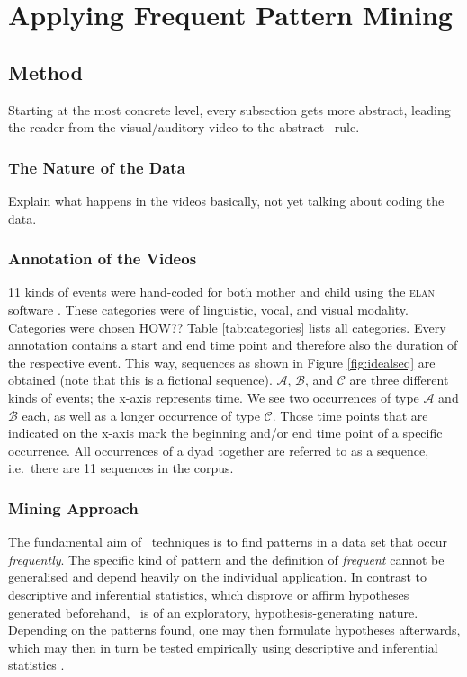 
\chapter{Applying Frequent Pattern Mining}
\section{Method}
Starting at the most concrete level, every subsection gets more abstract, leading the reader from the visual/auditory video to the abstract \fpm~rule.

\subsection{The Nature of the Data}
Explain what happens in the videos basically, not yet talking about coding the data.

\subsection{Annotation of the Videos}
11 kinds of events were hand-coded for both mother and child using the \textsc{elan} software \cite{wittenburg06}. These categories were of linguistic, vocal, and visual modality. Categories were chosen HOW??  %
Table \ref{tab:categories} lists all categories. Every annotation contains a start and end time point and therefore also the duration of the respective event. This way, sequences as shown in Figure \ref{fig:idealseq} are obtained (note that this is a fictional sequence). \(\mathcal{A}\), \(\mathcal{B}\), and \(\mathcal{C}\) are three different kinds of events; the x-axis represents time. We see two occurrences of type \(\mathcal{A}\) and \(\mathcal{B}\) each, as well as a longer occurrence of type \(\mathcal{C}\). Those time points that are indicated on the x-axis mark the beginning and/or end time point of a specific occurrence. All occurrences of a dyad together are referred to as a sequence, i.e.~there are 11 sequences in the corpus.




\subsection{Mining Approach}
The fundamental aim of \fpm~techniques is to find patterns in a data set that occur \emph{frequently}. The specific kind of pattern and the definition of \emph{frequent} cannot be generalised and depend heavily on the individual application. In contrast to descriptive and inferential statistics, which disprove or affirm hypotheses generated beforehand, \fpm~is of an exploratory, hypothesis-generating nature. Depending on the patterns found, one may then formulate hypotheses afterwards, which may then in turn be tested empirically using descriptive and inferential statistics \cite[6~ff.,~tba]{rohlfing18,han12}.%

